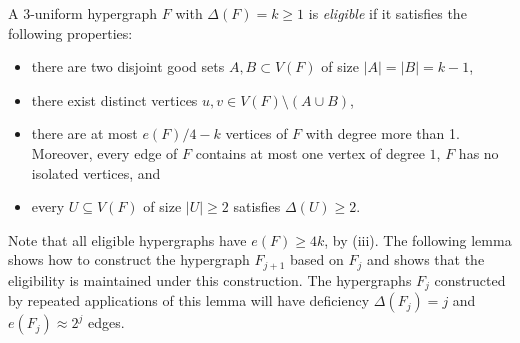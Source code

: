 \begin{definition}\label{defn:eligible}
A 3-uniform hypergraph $F$ with $\Delta(F)=k\geq 1$ is \textit{eligible} if it satisfies the following properties:
\begin{itemize}
    \item[(i)] there are two disjoint good sets $A, B\subset V(F)$ of size $|A|=|B|=k-1$,
    \item[(ii)] there exist distinct vertices $u, v \in V(F) \setminus (A \cup B)$,
    \item[(iii)] there are at most $e(F)/4-k$ vertices of $F$ with degree more than 1. Moreover, every edge of $F$ contains at most one vertex of degree $1$, $F$ has no isolated vertices, and
    \item[(iv)] every $U\subseteq V(F)$ of size $|U|\geq 2$ satisfies $\Delta(U)\geq 2$.
\end{itemize}
\end{definition}

\noindent
Note that all eligible hypergraphs have $e(F)\geq 4k$, by (iii). The following lemma shows how to construct the hypergraph $F_{j+1}$ based on $F_j$ and shows that the eligibility is maintained under this construction. The hypergraphs $F_j$ constructed by repeated applications of this lemma will have deficiency $\Delta(F_j)=j$ and $e(F_j)\approx 2^j$ edges.

